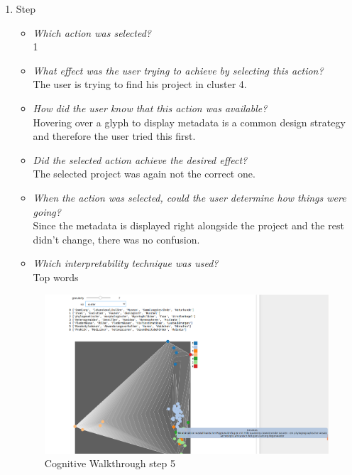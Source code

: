 {\begin{enumerate}
		\item Step
		\begin{itemize}
			\item \textit{Which action was selected?} \\
			1
			\item \textit{What effect was the user trying to achieve by selecting this action?} \\
			The user is trying to find his project in cluster 4. 
			\item \textit{How did the user know that this action was available?} \\
			Hovering over a glyph to display metadata is a common design strategy and therefore the user tried this first. 
			\item \textit{Did the selected action achieve the desired effect?} \\
			The selected project was again not the correct one. 
			\item \textit{When the action was selected, could the user determine how things were going?} \\
			Since the metadata is displayed right alongside the project and the rest didn't change, there was no confusion.
			\item \textit{Which interpretability technique was used?}\\
			Top words
		\end{itemize}
		\begin{figure}[H]
			\centering
			\includegraphics[width=400px]{../chapters/validation/pics/4_c}
			\caption{\label{pic:step5} Cognitive Walkthrough step 5}
		\end{figure} \newpage
		

\end{enumerate}}
